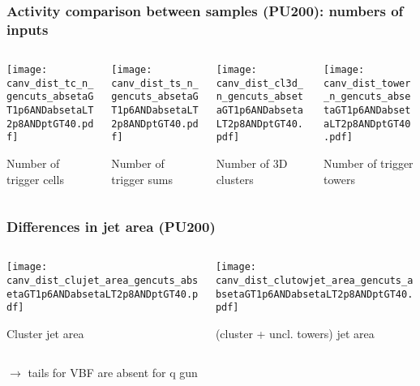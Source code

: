 \documentclass[8pt]{beamer}
\begin{document}
\begin{frame}
 \frametitle{Activity comparison between samples (PU200): numbers of inputs}
 
 \begin{columns}
  \begin{column}{0.3\textwidth}
   \texttt{[image: canv\_dist\_tc\_n\_gencuts\_absetaGT1p6ANDabsetaLT2p8ANDptGT40.pdf]}
   
   Number of trigger cells
  \end{column}
  \begin{column}{0.3\textwidth}
   \texttt{[image: canv\_dist\_ts\_n\_gencuts\_absetaGT1p6ANDabsetaLT2p8ANDptGT40.pdf]}
   
   Number of trigger sums
  \end{column}
  \begin{column}{0.3\textwidth}
   \texttt{[image: canv\_dist\_cl3d\_n\_gencuts\_absetaGT1p6ANDabsetaLT2p8ANDptGT40.pdf]}
   
   Number of 3D clusters
  \end{column}
  \begin{column}{0.3\textwidth}
   \texttt{[image: canv\_dist\_tower\_n\_gencuts\_absetaGT1p6ANDabsetaLT2p8ANDptGT40.pdf]}
   
   Number of trigger towers
  \end{column}
 \end{columns}

\end{frame}

\begin{frame}
 \frametitle{Differences in jet area (PU200)}
 
 \begin{columns}
  \begin{column}{0.5\textwidth}
   \texttt{[image: canv\_dist\_clujet\_area\_gencuts\_absetaGT1p6ANDabsetaLT2p8ANDptGT40.pdf]}
   
   Cluster jet area
  \end{column}
  \begin{column}{0.5\textwidth}
   \texttt{[image: canv\_dist\_clutowjet\_area\_gencuts\_absetaGT1p6ANDabsetaLT2p8ANDptGT40.pdf]}
   
   (cluster + uncl. towers) jet area
  \end{column}
 \end{columns}
 
 \vspace{20pt}
 
 $\to$ tails for VBF are absent for q gun
\end{frame}
\end{document}
